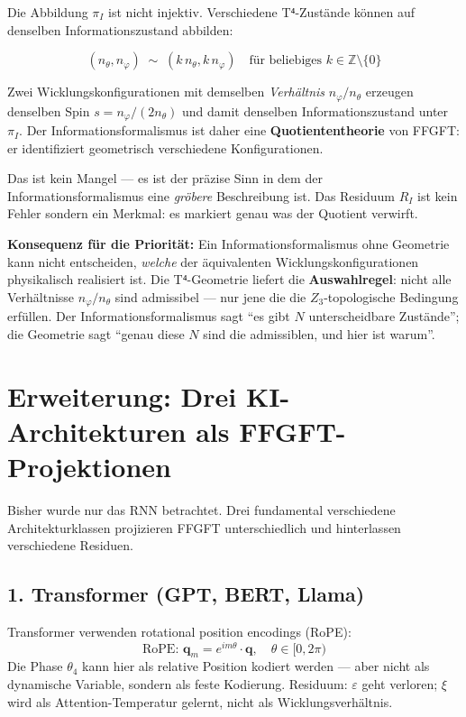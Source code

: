 Die Abbildung $\pi_I$ ist nicht injektiv. Verschiedene T⁴-Zustände können
auf denselben Informationszustand abbilden:

\begin{equation}
  (n_\theta, n_\varphi) \;\sim\; (k\,n_\theta, k\,n_\varphi)
  \quad\text{für beliebiges } k \in \mathbb{Z}\setminus\{0\}
  \tag{243.10}
\end{equation}

Zwei Wicklungskonfigurationen mit demselben \emph{Verhältnis}
$n_\varphi/n_\theta$ erzeugen denselben Spin $s = n_\varphi/(2n_\theta)$
und damit denselben Informationszustand unter $\pi_I$.
Der Informationsformalismus ist daher eine \textbf{Quotiententheorie}
von FFGFT: er identifiziert geometrisch verschiedene Konfigurationen.

Das ist kein Mangel --- es ist der präzise Sinn in dem der Informations\-formalismus
eine \emph{gröbere} Beschreibung ist. Das Residuum $R_I$ ist kein Fehler
sondern ein Merkmal: es markiert genau was der Quotient verwirft.

\textbf{Konsequenz für die Priorität:} Ein Informationsformalismus ohne
Geometrie kann nicht entscheiden, \emph{welche} der äquivalenten
Wicklungskonfigurationen physikalisch realisiert ist. Die T⁴-Geometrie
liefert die \textbf{Auswahlregel}: nicht alle Verhältnisse $n_\varphi/n_\theta$
sind admissibel --- nur jene die die $Z_3$-topologische Bedingung erfüllen.
Der Informationsformalismus sagt ``es gibt $N$ unterscheidbare Zustände'';
die Geometrie sagt ``genau diese $N$ sind die admissiblen, und hier ist warum''.


\section{Erweiterung: Drei KI-Architekturen als FFGFT-Projektionen}

Bisher wurde nur das RNN betrachtet. Drei fundamental verschiedene
Architekturklassen projizieren FFGFT unterschiedlich und hinterlassen
verschiedene Residuen.

\subsection*{1. Transformer (GPT, BERT, Llama)}

Transformer verwenden rotational position encodings (RoPE):
\begin{equation}
  \text{RoPE: } \mathbf{q}_m = e^{im\theta} \cdot \mathbf{q},
  \quad \theta \in [0, 2\pi)
  \tag{243.12}
\end{equation}
Die Phase $\theta_4$ kann hier als relative Position kodiert werden ---
aber nicht als dynamische Variable, sondern als feste Kodierung.
Residuum: $\varepsilon$ geht verloren; $\xi$ wird als Attention-Temperatur
gelernt, nicht als Wicklungsverhältnis.

